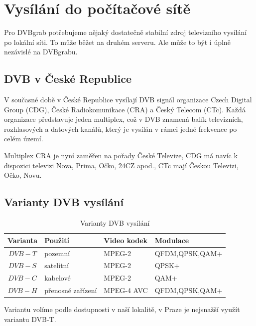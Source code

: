 \chapter{Vysílání do počítačové sítě}

Pro DVBgrab potřebujeme nějaký dostatečně stabilní zdroj televizního vysílání po lokální síti. To může běžet na druhém serveru. Ale může to být i úplně nezávislé na DVBgrabu.

\vspace{10pt}
\section{DVB v České Republice}

V současné době v České Republice vysílají DVB signál organizace Czech Digital Group (CDG), České Radiokomunikace (CRA) a Český Telecom (CTc). Každá organizace představuje jeden multiplex, což v DVB znamená balík televizních, rozhlasových a datových kanálů, který je vysílán v rámci jedné frekvence po celém území.

Multiplex CRA je nyní zaměřen na pořady České Televize, CDG má navíc k dispozici televizi Nova, Prima, Očko, 24CZ apod., CTc mají Českou Televizi, Očko, Novu.

\section{Varianty DVB vysílání}

\begin{table}
\begin{center}
\begin{tabular}{|c|l|l|l|}
\hline
\bf{Varianta} & \bf{Použití} & \bf{Video kodek} & \bf{Modulace} \\
\hline
$DVB-T$ & pozemní & MPEG-2 & QFDM,QPSK,QAM+\\
\hline
$DVB-S$ & satelitní & MPEG-2 & QPSK+\\
\hline
$DVB-C$ & kabelové & MPEG-2 & QAM+\\
\hline
$DVB-H$ & přenosné zařízení & MPEG-4 AVC & QFDM,QPSK,QAM+\\
\hline
\end{tabular}
\end{center}
\caption{Varianty DVB vysílání}
\label{tab:tab1}
\end{table}

Variantu volíme podle dostupnosti v naší lokalitě, v Praze je nejsnažší využít variantu DVB-T.

\vspace{10pt}

